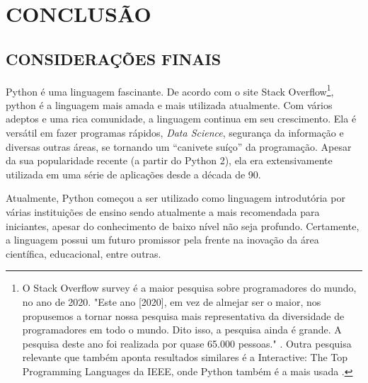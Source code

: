 
\chapter{CONCLUSÃO}
\label{chap:conclusao}
\section{CONSIDERAÇÕES FINAIS}
\label{sec:consideracoesFinais}

Python é uma linguagem fascinante.
De acordo com o site Stack Overflow\footnote{
    O Stack Overflow survey é a maior pesquisa sobre programadores do mundo, no ano de 2020.
    "Este ano [2020], em vez de almejar ser o maior, nos propusemos a tornar nossa pesquisa mais representativa da diversidade de programadores em todo o mundo. 
    Dito isso, a pesquisa ainda é grande.
    A pesquisa deste ano foi realizada por quase 65.000 pessoas." .
    Outra pesquisa relevante que também aponta resultados similares é a Interactive: The Top Programming Languages da IEEE, onde Python também é a mais usada .
}, python é a linguagem mais amada e mais utilizada atualmente.
Com vários adeptos e uma rica comunidade, a linguagem continua em seu crescimento.
Ela é versátil em fazer programas rápidos, \textit{Data Science}, segurança da informação e diversas outras áreas, se tornando um “canivete suíço” da programação.
Apesar da sua popularidade recente (a partir do Python 2), ela era extensivamente utilizada em uma série de aplicações desde a década de 90.

Atualmente, Python começou a ser utilizado como linguagem introdutória por várias instituições de ensino sendo atualmente a mais recomendada para iniciantes, apesar do conhecimento de baixo nível não seja profundo.
Certamente, a linguagem possui um futuro promissor pela frente na inovação da área científica, educacional, entre outras.
